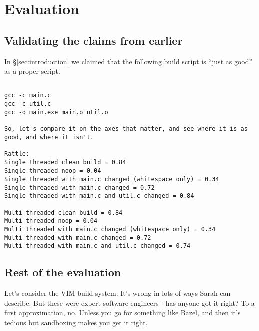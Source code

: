 \section{Evaluation}
\label{sec:evaluation}

\subsection{Validating the claims from earlier}

In \S\ref{sec:introduction} we claimed that the following build script is ``just as good'' as a proper \Make script.

\begin{verbatim}

gcc -c main.c
gcc -c util.c
gcc -o main.exe main.o util.o

So, let's compare it on the axes that matter, and see where it is as good, and where it isn't.

Rattle:
Single threaded clean build = 0.84
Single threaded noop = 0.04
Single threaded with main.c changed (whitespace only) = 0.34
Single threaded with main.c changed = 0.72
Single threaded with main.c and util.c changed = 0.84

Multi threaded clean build = 0.84
Multi threaded noop = 0.04
Multi threaded with main.c changed (whitespace only) = 0.34
Multi threaded with main.c changed = 0.72
Multi threaded with main.c and util.c changed = 0.74
\end{verbatim}

\subsection{Rest of the evaluation}

Let's consider the VIM build system. It's wrong in lots of ways Sarah can describe. But these were expert software engineers - has anyone got it right? To a first approximation, no. Unless you go for something like Bazel, and then it's tedious but sandboxing makes you get it right.
